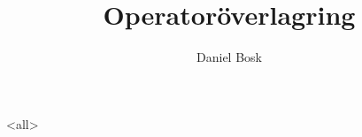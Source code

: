 \documentclass[ignoreframetext]{beamer}
\begin{document}
\title{%
  Operatoröverlagring
}
\author{Daniel Bosk}

\begin{frame}
  \maketitle
\end{frame}

\mode<all>

\mode*
\end{document}
